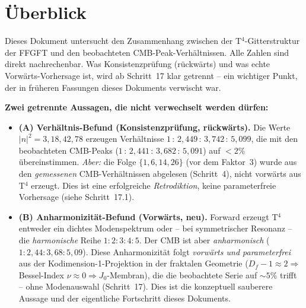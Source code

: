 %
%

\section*{Überblick}

Dieses Dokument untersucht den Zusammenhang zwischen der
T$^4$-Gitterstruktur der FFGFT und den beobachteten CMB-Peak-Verhältnissen.
Alle Zahlen sind direkt nachrechenbar. Was Konsistenzprüfung (rückwärts) und
was echte Vorwärts-Vorhersage ist, wird ab Schritt~17 klar getrennt --
ein wichtiger Punkt, der in früheren Fassungen dieses Dokuments verwischt war.

\textbf{Zwei getrennte Aussagen, die nicht verwechselt werden dürfen:}
\begin{itemize}
  \item \textbf{(A) Verhältnis-Befund (Konsistenzprüfung, rückwärts).}
        Die Werte $|n|^2 = 3, 18, 42, 78$ erzeugen Verhältnisse
        $1\,:\,2{,}449\,:\,3{,}742\,:\,5{,}099$, die mit den beobachteten
        CMB-Peaks ($1\,:\,2{,}441\,:\,3{,}682\,:\,5{,}091$) auf $<2\%$
        übereinstimmen. \emph{Aber:} die Folge $\{1,6,14,26\}$ (vor dem
        Faktor~3) wurde aus den \emph{gemessenen} CMB-Verhältnissen
        abgelesen (Schritt~4), nicht vorwärts aus T$^4$ erzeugt. Dies ist
        eine erfolgreiche \emph{Retrodiktion}, keine parameterfreie
        Vorhersage (siehe Schritt~17.1).
  \item \textbf{(B) Anharmonizität-Befund (Vorwärts, neu).}
        Forward erzeugt T$^4$ entweder ein dichtes Modenspektrum oder --
        bei symmetrischer Resonanz -- die \emph{harmonische} Reihe
        $1:2:3:4:5$. Der CMB ist aber \emph{anharmonisch}
        ($1:2{,}44:3{,}68:5{,}09$). Diese Anharmonizität folgt
        \emph{vorwärts und parameterfrei} aus der Kodimension-1-Projektion
        in der fraktalen Geometrie ($D_f-1 \approx 2 \Rightarrow$
        Bessel-Index $\nu\approx0 \Rightarrow J_0$-Membran), die die
        beobachtete Serie auf $\sim5\%$ trifft -- ohne Modenauswahl
        (Schritt~17). Dies ist die konzeptuell sauberere Aussage und der
        eigentliche Fortschritt dieses Dokuments.
\end{itemize}

